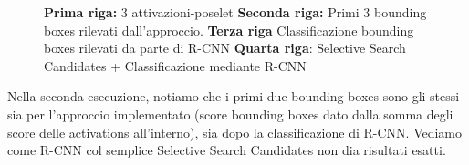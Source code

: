   \begin{figure}[h]
 \centering
 \hspace{5mm}
 \hspace{5mm}

 \newline
 \hspace{5mm}
 \hspace{5mm}

 \newline
 \hspace{5mm}
 \hspace{5mm}
 
 \hspace{5mm}
 \hspace{5mm}
 \caption{\textbf{Prima riga:} 3 attivazioni-poselet \textbf{Seconda riga:} Primi 3 bounding boxes rilevati dall'approccio. \newline \textbf{Terza riga} Classificazione bounding boxes rilevati da parte di R-CNN\newline
 \textbf{Quarta riga}: Selective Search Candidates + Classificazione mediante R-CNN }
 \end{figure}
 
 Nella seconda esecuzione, notiamo che i primi due bounding boxes sono gli stessi sia per l'approccio implementato (score bounding boxes dato dalla somma degli score delle activations all'interno), sia dopo la classificazione di R-CNN. Vediamo come R-CNN col semplice Selective Search Candidates non dia risultati esatti.